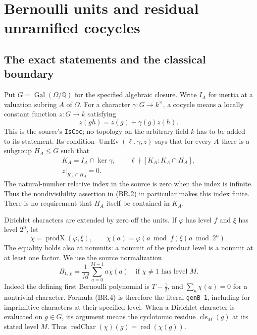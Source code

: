 \section{Bernoulli units and residual unramified cocycles}
\label{sec:bernoulli-residual}


\subsection{The exact statements and the classical boundary}

Put $G=\operatorname{Gal}(\Omega/\mathbb Q)$ for the specified algebraic
closure.  Write $I_A$ for inertia at a valuation subring $A$ of $\Omega$.
For a character $\gamma:G\to k^\times$, a cocycle means a locally
constant function $z:G\to k$ satisfying
\[
                  z(gh)=z(g)+\gamma(g)z(h).
                  \tag{BR.1}
\]
This is the source's \texttt{IsCoc}; no topology on the arbitrary field
$k$ has to be added to its statement.  Its condition
$\operatorname{UnrEv}(\ell,\gamma,z)$ says that for every $A$ there is
a subgroup $H_A\le G$ such that
\[
 \begin{gathered}
  K_A=I_A\cap\ker\gamma,\qquad
  \ell\nmid[K_A:K_A\cap H_A],\\
  z|_{K_A\cap H_A}=0.
 \end{gathered}
 \tag{BR.2}
\]
The natural-number relative index in the source is zero when the index
is infinite.  Thus the nondivisibility assertion in (BR.2) in
particular makes this index finite.  There is no requirement that
$H_A$ itself be contained in $K_A$.

Dirichlet characters are extended by zero off the units.  If $\varphi$
has level $f$ and $\xi$ has level $2^n$, let
\[
 \chi=\operatorname{prodX}(\varphi,\xi),\qquad
 \chi(a)=\varphi(a\bmod f)\xi(a\bmod 2^n).
 \tag{BR.3}
\]
The equality holds also at nonunits: a nonunit of the product level is
a nonunit at at least one factor.  We use the source normalization
\[
 B_{1,\chi}=\frac1M\sum_{a=0}^{M-1}a\chi(a)
 \quad\text{if }\chi\ne1\text{ has level }M.
 \tag{BR.4}
\]
Indeed the defining first Bernoulli polynomial is $T-\tfrac12$, and
$\sum_a\chi(a)=0$ for a nontrivial character.  Formula (BR.4) is
therefore the literal \texttt{genB 1}, including for imprimitive
characters at their specified level.
When a Dirichlet character is evaluated on $g\in G$, its argument
means the cyclotomic residue $\operatorname{cls}_M(g)$ at its stated
level $M$.  Thus
$\operatorname{redChar}(\chi)(g)=\operatorname{red}(\chi(g))$.

